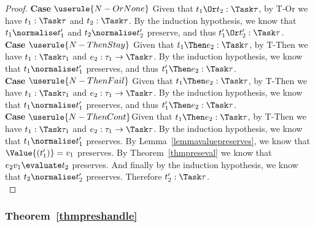 \begin{proof}
  \noindent\textbf{Case} $\userule{N-OrNone}$ Given that $t_1\Or t_2:\Task\tau$,
  by T-Or we have $t_1:\Task\tau$ and $t_2:\Task\tau$. By the induction hypothesis,
  we know that $t_1\normalise t_1'$ and $t_2\normalise t_2'$ preserve, and thus
  $t_1'\Or t_2':\Task\tau$.\\

  \noindent\textbf{Case} $\userule{N-ThenStay}$ Given that $t_1\Then e_2:\Task\tau$,
  by T-Then we have $t_1:\Task\tau_1$ and $e_2:\tau_1\to\Task\tau$. By the induction
  hypothesis, we know that $t_1\normalise t_1'$ preserves, and thus $t_1'\Then e_2:\Task\tau$.\\

  \noindent\textbf{Case} $\userule{N-ThenFail}$ Given that $t_1\Then e_2:\Task\tau$,
  by T-Then we have $t_1:\Task\tau_1$ and $e_2:\tau_1\to\Task\tau$. By the induction
  hypothesis, we know that $t_1\normalise t_1'$ preserves, and thus $t_1'\Then e_2:\Task\tau$.\\

  \noindent\textbf{Case} $\userule{N-ThenCont}$Given that $t_1\Then e_2:\Task\tau$,
  by T-Then we have $t_1:\Task\tau_1$ and $e_2:\tau_1\to\Task\tau$. By the induction
  hypothesis, we know that $t_1\normalise t_1'$ preserves. By
  Lemma~\ref{lemmavaluepreserves}, we know that $\Value{(t_1')}=v_1$ preserves.
  By Theorem~\ref{thmpreseval} we know that $e_2 v_1\evaluate t_2$ preserves. And
  finally by the induction hypothesis, we know that $t_2\normalise t_2'$ preserves.
  Therefore $t_2':\Task\tau$.\\

\end{proof}


\subsubsection{Theorem~\ref{thmpreshandle}}

